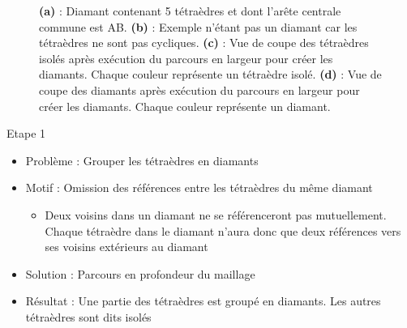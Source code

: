 \documentclass[9pt]{beamer}
\begin{document}
\begin{frame}
\begin{figure}[H]
\begin{subfigure}{.24\textwidth}
  \caption{}
\end{subfigure}
\caption{\textbf{(a)} : Diamant contenant 5 tétraèdres et dont l'arête centrale commune est AB. \textbf{(b)} : Exemple n'étant pas un diamant car les tétraèdres ne sont pas cycliques. \textbf{(c)} : Vue de coupe des tétraèdres isolés après exécution du parcours en largeur pour créer les diamants. Chaque couleur représente un tétraèdre isolé. \textbf{(d)} : Vue de coupe des diamants après exécution du parcours en largeur pour créer les diamants. Chaque couleur représente un diamant.}
\end{figure}
\begin{block}{Etape 1}
\begin{itemize}
\item Problème : Grouper les tétraèdres en diamants
\item Motif : Omission des références entre les tétraèdres du même diamant
\begin{itemize}
\item Deux voisins dans un diamant ne se référenceront pas mutuellement. Chaque tétraèdre dans le diamant n'aura donc que deux références vers ses voisins extérieurs au diamant
\end{itemize}
\item Solution : Parcours en profondeur du maillage
\item Résultat : Une partie des tétraèdres est groupé en diamants. Les autres tétraèdres sont dits isolés
\end{itemize}
\end{block}
\end{frame}
\end{document}
